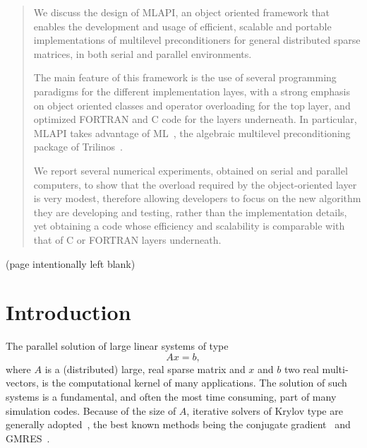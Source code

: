 \documentclass{article}[11pt]
\newcommand{\ML}     {{\sc ML}}
\newcommand{\MLAPI}  {{\sc MLAPI }}
\newcommand{\MLAPIns}  {{\sc MLAPI}}
\begin{document}
\begin{abstract}
We discuss the design of \MLAPIns, an object oriented framework that enables 
the development and usage of efficient,
scalable and portable implementations of multilevel preconditioners for
general distributed sparse matrices, in
both serial and parallel environments. 

\smallskip

The main feature of this framework is the use of several programming paradigms
for the different implementation layes, with a strong emphasis on object
oriented classes and operator overloading for the top layer, and optimized
FORTRAN and C code for the layers underneath. In particular, \MLAPI takes
advantage of \ML~\cite{ml-guide}, the algebraic multilevel preconditioning
package of Trilinos~\cite{Trilinos-home-page}. 

\smallskip

We report several numerical experiments, obtained on serial and parallel
computers, to show that the overload required by the object-oriented layer
is very modest, therefore allowing developers to focus on
the new algorithm they are developing and testing, rather than the implementation details, yet obtaining a
code whose efficiency and scalability is comparable with that of C or FORTRAN
layers underneath.
\end{abstract}

%
\clearpage
\newpage

\vfill
\begin{center}
(page intentionally left blank)
\end{center}
\clearpage
\newpage


\tableofcontents
\newpage

\section{Introduction} 
\label{sec:introduction}

The parallel solution of large linear systems of type
\begin{equation}
\label{eq:lin_sys}
A {x} = {b},
\end{equation}
where $A$ is a (distributed) large, real sparse matrix and $x$ and $b$ two real
multi-vectors, is the computational kernel of many applications. The solution
of such systems is a fundamental, and often the most time consuming,
  part of many simulation codes. Because of
the size of $A$, iterative solvers of Krylov type are generally
adopted~\cite{barret93templates}, the
best known methods being the conjugate gradient~\cite{hestenes52method} and
GMRES~\cite{saad86gmres}.
  
\end{document}
